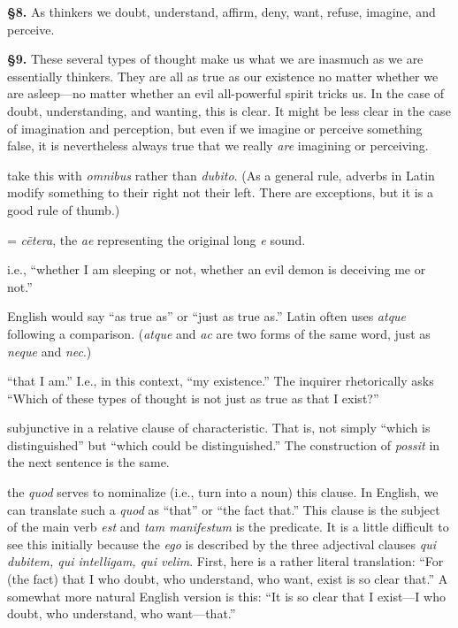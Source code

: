 \prenotes

\textbf{§8.} As thinkers we doubt, understand, affirm, deny, want, refuse, imagine, and perceive.

\textbf{§9.} These several types of thought make us what we are inasmuch as we are essentially thinkers. They are all as true as our existence no matter whether we are asleep---no matter whether an evil all-powerful spirit tricks us. In the case of doubt, understanding, and wanting, this is clear. It might be less clear in the case of imagination and perception, but even if we imagine or perceive something false, it is nevertheless always true that we really \textit{are} imagining or perceiving.

 take this with \textit{omnibus} rather than \textit{dubito}. (As a general rule, adverbs in Latin modify something to their right not their left. There are exceptions, but it is a good rule of thumb.)

 = \textit{cētera}, the \textit{ae} representing the original long \textit{e} sound.

 i.e., ``whether I am sleeping or not, whether an evil demon is deceiving me or not.''

 English would say ``as true as'' or ``just as true as.'' Latin often uses \textit{atque} following a comparison. (\textit{atque} and \textit{ac} are two forms of the same word, just as \textit{neque} and \textit{nec}.)

 ``that I am.'' I.e., in this context, ``my existence.'' The inquirer rhetorically asks ``Which of these types of thought is not just as true as that I exist?''

 subjunctive in a relative clause of characteristic. That is, not simply ``which is distinguished'' but ``which could be distinguished.'' The construction of \textit{possit} in the next sentence is the same.

 the \textit{quod} serves to nominalize (i.e., turn into a noun) this clause. In English, we can translate such a \textit{quod} as ``that'' or ``the fact that.'' This clause is the subject of the main verb \textit{est} and \textit{tam manifestum} is the predicate. It is a little difficult to see this initially because the \textit{ego} is described by the three adjectival clauses \textit{qui dubitem, qui intelligam, qui velim}. First, here is a rather literal translation: ``For (the fact) that I who doubt, who understand, who want, exist is so clear that.'' A somewhat more natural English version is this: ``It is so clear that I exist---I who doubt, who understand, who want---that.''

